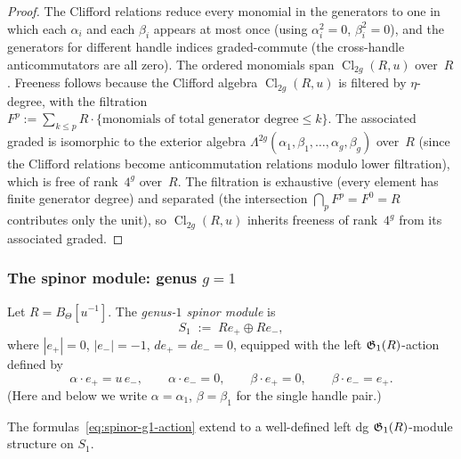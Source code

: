 \begin{proof}
The Clifford relations reduce every monomial in the generators to
one in which each $\alpha_i$ and each $\beta_i$ appears at most
once (using $\alpha_i^2 = 0$, $\beta_i^2 = 0$), and the
generators for different handle indices graded-commute (the
cross-handle anticommutators are all zero).
The ordered monomials span $\operatorname{Cl}_{2g}(R,u)$
over~$R$.
Freeness follows because the Clifford algebra
$\operatorname{Cl}_{2g}(R,u)$ is filtered by $\eta$-degree,
with the filtration $F^p := \sum_{k \leq p} R \cdot
\{\text{monomials of total generator degree} \leq k\}$.
The associated graded is isomorphic to the exterior algebra
$\Lambda^{2g}(\alpha_1,\beta_1,\dots,\alpha_g,\beta_g)$
over~$R$ (since the Clifford relations become anticommutation
relations modulo lower filtration), which is free of rank~$4^g$
over~$R$. The filtration is exhaustive (every element has
finite generator degree) and separated (the intersection
$\bigcap_p F^p = F^0 = R$ contributes only the unit),
so $\operatorname{Cl}_{2g}(R,u)$ inherits freeness of
rank~$4^g$ from its associated graded.
\end{proof}

\subsubsection{The spinor module: genus $g = 1$}

\begin{definition}
Let $R = B_\Theta[u^{-1}]$.
The \emph{genus-$1$ spinor module} is
\[
S_1 \;:=\; R e_+ \oplus R e_-,
\]
where $|e_+| = 0$, $|e_-| = -1$, $de_+ = de_- = 0$, equipped with
the left $\mathfrak{G}_1(R)$-action defined by
\begin{equation}%
\alpha \cdot e_+ = u\,e_-,\qquad
\alpha \cdot e_- = 0,\qquad
\beta \cdot e_+ = 0,\qquad
\beta \cdot e_- = e_+.
\end{equation}
(Here and below we write $\alpha = \alpha_1$, $\beta = \beta_1$
for the single handle pair.)
\end{definition}

\begin{proposition}
The formulas~\eqref{eq:spinor-g1-action} extend to a well-defined
left dg $\mathfrak{G}_1(R)$-module structure on $S_1$.
\end{proposition}

